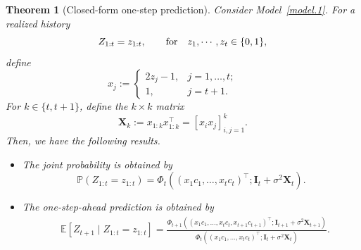 \documentclass[11pt,authoryear]{elsarticle}
\def\P#1{{\mathbb{P}}\left(#1\right)}
\def\E#1{{\mathbb E}\left[#1\right]}
\newtheorem{theorem}{Theorem}
\theoremstyle{nopunct}
\numberwithin{equation}{section}
\begin{document}
\begin{theorem}[Closed-form one-step prediction]
\label{thm.1}
Consider Model~\ref{model.1}. For a realized history
\[
Z_{1:t}=z_{1:t},
\qquad\hbox{for}\quad
z_1, \cdots, z_t\in\{0,1\}, 
\]
define
\begin{equation}\label{eq.10}
x_j:=\begin{cases}
2z_j-1, &j=1,\ldots,t;\\
1, &j=t+1 .
\end{cases}
\qquad 
\end{equation}
For \(k\in\{t,t+1\}\), define the \(k\times k\) matrix
\begin{equation}\label{eq.8}
\boldsymbol X_k
:=
x_{1:k}x_{1:k}^\top
=
\left[x_ix_j\right]_{i,j=1}^k.
\end{equation}
Then, we have the following results.
\begin{itemize}
  \item[i.]   The joint probability is 
obtained by
\[
  \P{Z_{1:t}=z_{1:t}}=\Phi_t
\left(
\left(
x_1c_1,\ldots,
x_tc_t
\right)^\top;
\boldsymbol I_t
+
\sigma^2\boldsymbol X_t
\right).
  \]
  \item[ii.] The one-step-ahead prediction 
  is obtained by
  \[
\begin{aligned}
&\E{
Z_{t+1}\mid Z_{1:t}=z_{1:t}
} =
\frac{
\Phi_{t+1}
\left(
\left(
x_1c_1,\ldots,
x_tc_t,
x_{t+1}c_{t+1}
\right)^\top;
\boldsymbol I_{t+1}
+
\sigma^2\boldsymbol X_{t+1}
\right)
}{
\Phi_t
\left(
\left(
x_1c_1,\ldots,
x_tc_t
\right)^\top;
\boldsymbol I_t
+
\sigma^2\boldsymbol X_t
\right)
}.
\end{aligned}
\]
\end{itemize}

\end{theorem}
\end{document}
